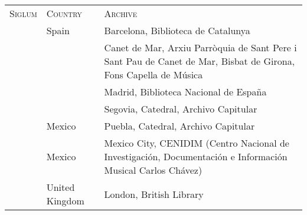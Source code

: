 \begin{tabu} to \textwidth{llZ}
    \textsc{Siglum} & \textsc{Country} & \textsc{Archive}\\
     & Spain & Barcelona, Biblioteca de Catalunya\\
     &  & Canet de Mar, Arxiu Parròquia de Sant Pere i Sant Pau de Canet de 
    Mar, Bisbat de Girona, Fons Capella de Música\\
     & &  Madrid, Biblioteca Nacional de España\\
     & & Segovia, Catedral, Archivo Capitular\\
     & Mexico &  Puebla, Catedral, Archivo Capitular\\
     & Mexico & 
    Mexico City, CENIDIM \foreignlanguage{spanish}{%
        (Centro Nacional de Investigación, Documentación e Información Musical
        Carlos Chávez)%
    }\\
     & United Kingdom & London, British Library\\
\end{tabu}





